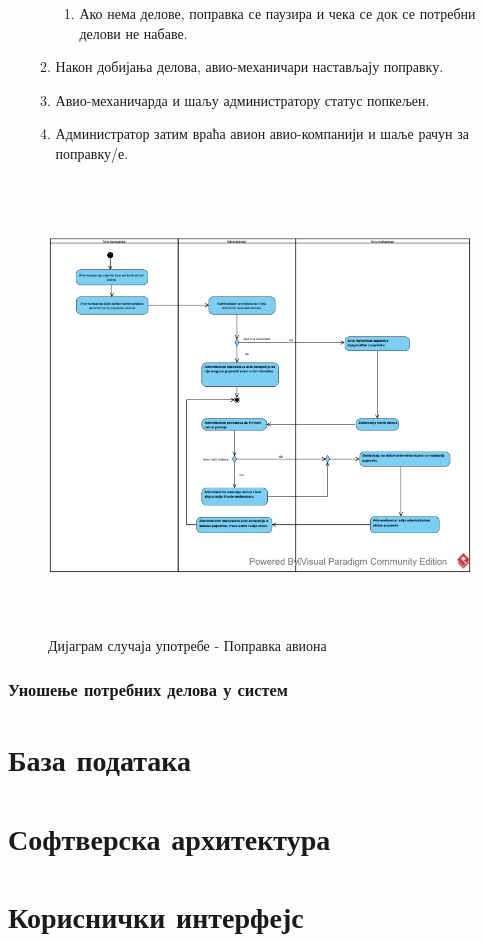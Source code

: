 \documentclass{article}
\begin{document}
\begin{itemize}
\begin{enumerate}
\begin{enumerate}
                    \item Ако нема делове, поправка се паузира и чека се док се потребни делови не набаве.
                \end{enumerate}
            \item Након добијања делова, авио-механичари настављају поправку.
            \item Авио-механичарда и шаљу администратору статус попкељен.
            \item Администратор затим враћа авион авио-компанији и шаље рачун за поправку/е.
        \end{enumerate}
\end{itemize}

\begin{figure}[H]
    \begin{center}
        \includegraphics[width=1.1\textwidth, height=12cm]{Dijagrami_slike/popravka_aviona.png}
        \caption{Дијаграм случаја употребе - Поправка авиона}
    \end{center}
\end{figure}

\subsubsection{Уношење потребних делова у систем}

\section{База података}

\section{Софтверска архитектура}

\section{Кориснички интерфејс}

\newpage

 
\end{document}
